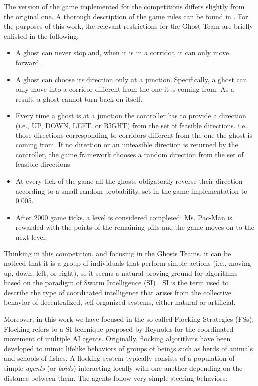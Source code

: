 \documentclass[a4paper]{llncs}
\begin{document}
The version of the game implemented for the competitions differs slightly from the original one. A thorough description of the game rules can be found in \cite{MsPacManVSGhost2011}. For the purposes of this work, the relevant restrictions for the Ghost Team are briefly enlisted in the following:
\begin{itemize}
  \item A ghost can never stop and, when it is in a corridor, it can only move forward.
  \item A ghost can choose its direction only at a junction. Specifically, a ghost can only move into a corridor different from the one it is coming from. As a result, a ghost cannot turn back on itself.
  \item Every time a ghost is at a junction the controller has to provide a direction (i.e., UP, DOWN, LEFT, or RIGHT) from the set of feasible directions, i.e., those directions corresponding to corridors different from the one the ghost is coming from. If no direction or an unfeasible direction is returned by the controller, the game framework chooses a random direction from the set of feasible directions.
  \item At every tick of the game all the ghosts obligatorily reverse their direction according to a small random probability, set in the game implementation to 0.005.
  \item After 2000 game ticks, a level is considered completed: Ms. Pac-Man is rewarded with the points of the remaining pills and the game moves on to the next level.
\end{itemize}

Thinking in this competition, and focusing in the Ghosts Teams, it can be noticed that it is a group of individuals that perform simple actions (i.e., moving up, down, left, or right), so it seems a natural proving ground for algorithms based on the paradigm of Swarm Intelligence (SI) \cite{BeniWang89}. SI is the term used to describe the type of coordinated intelligence that arises from the collective behavior of decentralized, self-organized systems, either natural or artificial.

Moreover, in this work we have focused in the so-called Flocking Strategies (FSs). Flocking refers to a SI technique proposed by Reynolds \cite{Reynolds87} for the coordinated movement of multiple AI agents. Originally, flocking algorithms have been developed to mimic lifelike behaviors of groups of beings such as herds of animals and schools of fishes. A flocking system typically consists of a population of simple \textit{agents} (or \textit{boids}) interacting locally with one another depending on the distance between them. The agents follow very simple steering behaviors:
\end{document}
